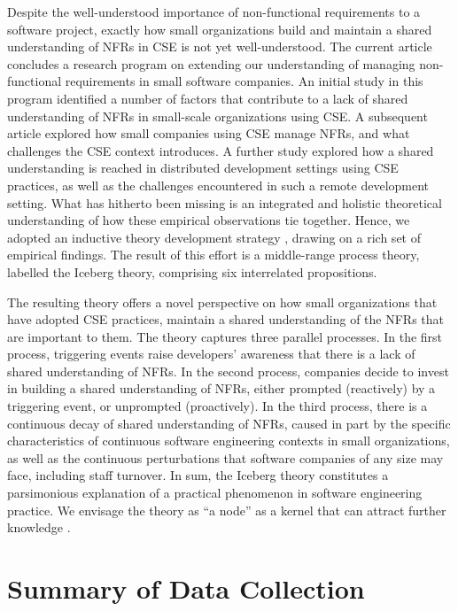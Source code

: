 \documentclass[smallextended]{svjour3}
\begin{document}
Despite the well-understood importance of non-functional requirements to a software project, exactly how small organizations build and maintain a shared understanding of NFRs in CSE is not yet well-understood.
The current article concludes a research program on extending our understanding of managing non-functional requirements in small software companies. An initial study in this program \citep{werner2020re} identified a number of factors that contribute to a lack of shared understanding of NFRs in small-scale organizations using CSE.
A subsequent article \citep{werner_tse_2021} explored how small companies using CSE manage NFRs, and what challenges the CSE context introduces. A further study \citep{okpara_re2022,okpara_rej2023} explored how a shared understanding is reached in distributed development settings using CSE practices, as well as the challenges encountered in such a remote development setting. 
What has hitherto been missing is an integrated and holistic theoretical understanding of how these empirical observations tie together. Hence, we adopted an inductive theory development strategy \citep{stol2018abc}, drawing on a rich set of empirical findings. The result of this effort is a middle-range process theory, labelled the Iceberg theory, comprising six interrelated propositions. 

The resulting theory offers a novel perspective on how small organizations that have adopted CSE practices, maintain a shared understanding of the NFRs that are important to them. The theory captures three parallel processes.
In the first process, triggering events raise developers' awareness that there is a lack of shared understanding of NFRs. In the second process, companies decide to invest in building a shared understanding of NFRs, either prompted (reactively) by a triggering event, or unprompted (proactively). In the third process, there is a continuous decay of shared understanding of NFRs, caused in part by the specific characteristics of continuous software engineering contexts in small organizations, as well as the continuous perturbations that software companies of any size may face, including staff turnover. 
In sum, the Iceberg theory constitutes a parsimonious explanation of a practical phenomenon in software engineering practice. We envisage the theory as ``a node'' as a kernel that can attract further knowledge \cite[p. xi]{miner2015organizational}.\\




\appendix
\normalsize
\section{Summary of Data Collection}
\label{app:datacollection}
\end{document}
